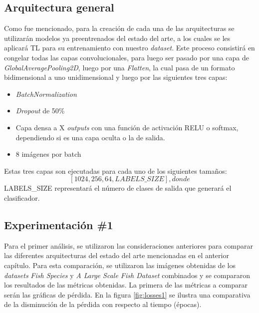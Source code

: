 \subsection{Arquitectura general}
Como fue mencionado, para la creación de cada una de las arquitecturas se utilizarán modelos ya preentrenados del estado del arte, a los cuales se les aplicará TL para su entrenamiento con nuestro \textit{dataset}. Este proceso consistirá en congelar todas las capas convolucionales, para luego ser pasado por una capa de \textit{GlobalAveragePooling2D}, luego por una \textit{Flatten}, la cual pasa de un formato bidimensional a uno unidimensional y luego por las siguientes tres capas: 
\begin{itemize}
    \item \textit{BatchNormalization}
    \item \textit{Dropout} de 50\%
    \item Capa densa a X \textit{outputs} con una función de activación RELU o softmax, dependiendo si es una capa oculta o la de salida.  
    \item 8 imágenes por batch 
\end{itemize}

Estas tres capas son ejecutadas para cada uno de los siguientes tamaños: 
$$[1024,256,64,LABELS\_SIZE], donde $$
LABELS\_SIZE representará el número de clases de salida que generará el clasificador.  

\subsection{Experimentación \#1}

Para el primer análisis, se utilizaron las consideraciones anteriores para comparar las diferentes arquitecturas del estado del arte mencionadas en el anterior capítulo. Para esta comparación, se utilizaron las imágenes obtenidas de los \textit{datasets} \textit{Fish Species} y \textit{A Large Scale Fish Dataset} combinados y se compararon los resultados de las métricas obtenidas. 
La primera de las métricas a comparar serán las gráficas de pérdida. En la figura \ref{fig:losses1} se ilustra una comparativa de la disminución de la pérdida con respecto al tiempo (épocas).

